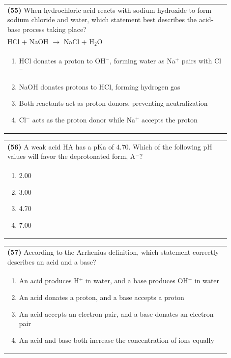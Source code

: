 \documentclass{article}
\begin{document}
\noindent\begin{tabular}{|p{0.9\linewidth}|}
\hline
\textbf{(55)} When hydrochloric acid reacts with sodium hydroxide to form sodium chloride and water, which statement best describes the acid-base process taking place?\\[0.2cm]
HCl + NaOH $\rightarrow$ NaCl + H$_2$O\\[0.2cm]
\begin{minipage}[t]{0.85\linewidth}
\begin{enumerate}[label=\alph*.]
\item HCl donates a proton to OH$^-$, forming water as Na$^+$ pairs with Cl$^-$
\item NaOH donates protons to HCl, forming hydrogen gas
\item Both reactants act as proton donors, preventing neutralization
\item Cl$^-$ acts as the proton donor while Na$^+$ accepts the proton
\end{enumerate}
\end{minipage}\\[0.2cm]
\hline
\end{tabular}

\noindent\begin{tabular}{|p{0.9\linewidth}|}
\hline
\textbf{(56)} A weak acid HA has a pKa of 4.70. Which of the following pH values will favor the deprotonated form, A$^-$? \\[0.2cm]
\begin{minipage}{0.85\linewidth}
\begin{enumerate}[label=\alph*.]
\item 2.00 \item 3.00 \item 4.70 \item 7.00
\end{enumerate}
\end{minipage}\\[0.2cm]
\hline
\end{tabular}
\newpage

\noindent\begin{tabular}{|p{0.9\linewidth}|}
\hline
\textbf{(57)} According to the Arrhenius definition, which statement correctly describes an acid and a base?\\[0.2cm]
\begin{minipage}[t]{0.85\linewidth}
\begin{enumerate}[label=\alph*.]
\item An acid produces H$^+$ in water, and a base produces OH$^-$ in water
\item An acid donates a proton, and a base accepts a proton
\item An acid accepts an electron pair, and a base donates an electron pair
\item An acid and base both increase the concentration of ions equally
\end{enumerate}
\end{minipage}\\[0.2cm]
\hline
\end{tabular}
\end{document}
